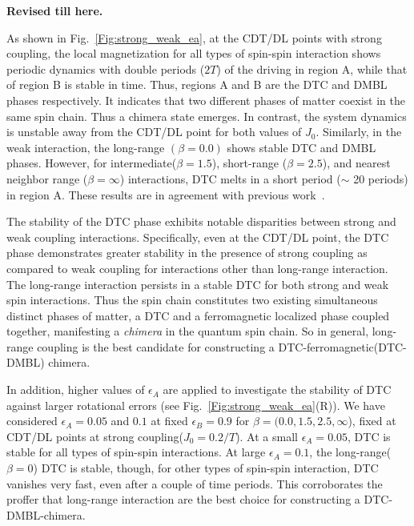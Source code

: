 \documentclass[%
nofootinbib,
reprint,
superscriptaddress,
amsmath,amssymb,showkeys,
aps,
prb,
]{revtex4-2}
\begin{document}
		\textbf{Revised till here.}
		
	As shown in Fig.~\ref{Fig:strong_weak_ea}, at the CDT/DL points with strong coupling, the local magnetization for all types of spin-spin interaction shows periodic dynamics with double periods ($2T$) of the driving in region A, while that of region B is stable in time. Thus, regions A and B are the DTC and DMBL phases respectively. It indicates that two different phases of matter coexist in the same spin chain. Thus a chimera state emerges. In contrast, the system dynamics is unstable away from the CDT/DL point for both values of $J_0$. Similarly, in the weak interaction, the long-range $(\beta=0.0)$ shows stable DTC and DMBL phases. However, for intermediate($\beta = 1.5$), short-range ($\beta = 2.5$), and nearest neighbor range ($\beta = \infty$) interactions, DTC melts in a short period ($\sim$ 20 periods) in region A. These results are in agreement with previous work~\cite{sakurai_phys_nodate}.
	
	The stability of the DTC phase exhibits notable disparities between strong and weak coupling interactions. Specifically, even at the CDT/DL point, the DTC phase demonstrates greater stability in the presence of strong coupling as compared to weak coupling for interactions other than long-range interaction. The long-range interaction persists in a stable DTC for both strong and weak spin interactions. Thus the spin chain constitutes two existing simultaneous distinct phases of matter, a DTC and a ferromagnetic localized phase coupled together, manifesting a \textit{chimera} in the quantum spin chain. So in general, long-range coupling is the best candidate for constructing a DTC-ferromagnetic(DTC-DMBL) chimera.
	
	In addition, higher values of $\epsilon_A$ are applied to investigate the stability of DTC against larger rotational errors (see Fig.~\ref{Fig:strong_weak_ea}(R)). We have considered $\epsilon_A = 0.05$  and $0.1$ at fixed $\epsilon_B = 0.9$ for $\beta = (0.0, 1.5, 2.5, \infty$), fixed at CDT/DL points at strong coupling($J_0 = 0.2/T$). At a small $\epsilon_A=0.05$, DTC is stable for all types of spin-spin interactions. At large $\epsilon_A = 0.1$, the long-range($\beta=0$) DTC is stable, though, for other types of spin-spin interaction, DTC vanishes very fast, even after a couple of time periods. This corroborates the proffer that long-range interaction are the best choice for constructing a DTC-DMBL-chimera. 
	
\end{document}
